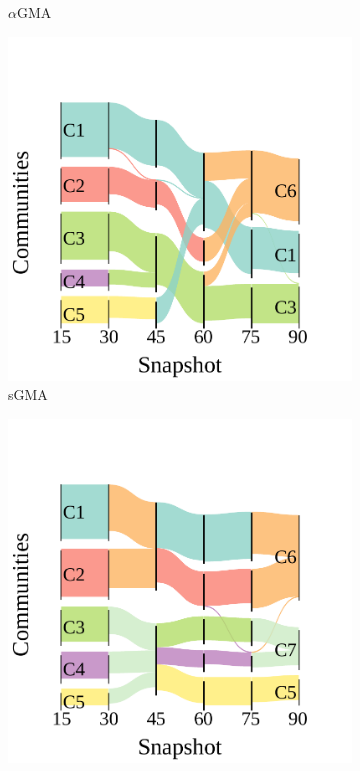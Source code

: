 \documentclass[letterpaper]{article}
\begin{document}
\begin{figure}[!t]
\begin{subfigure}[b]{.24\linewidth}
        \caption{$\alpha$GMA}
        \label{fig:sankey_noise_aGMA}
    \end{subfigure}
        \begin{subfigure}[b]{.24\linewidth}
        \centering
        \includegraphics[width=\linewidth]{figures/sankey_intermittence_sGMA.pdf}
        \caption{sGMA}
        \label{fig:sankey_noise_sGMA}
    \end{subfigure}
    \begin{subfigure}[b]{.24\linewidth}
        \centering
        \includegraphics[width=\linewidth]{figures/sankey_intermittence_neGMA.pdf}

\end{subfigure}
\end{figure}
\end{document}
